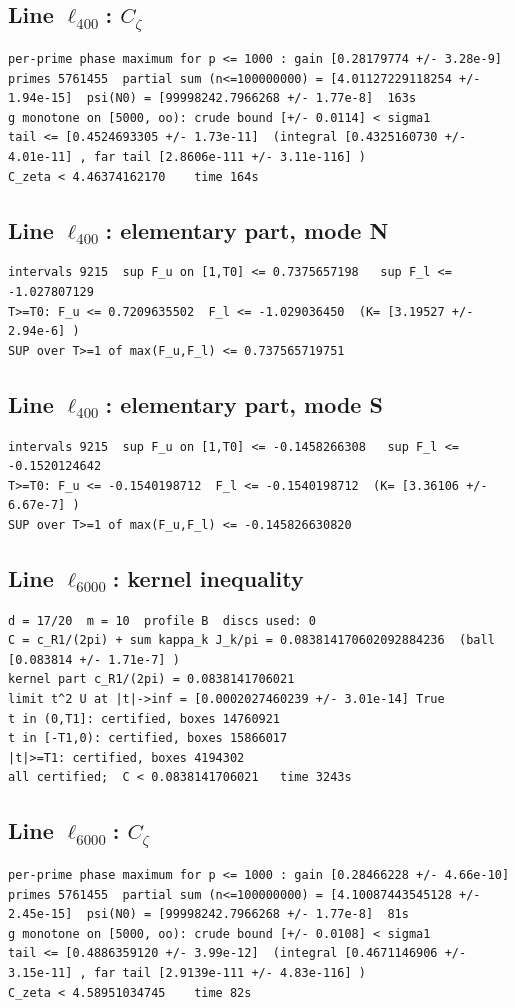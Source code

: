 \documentclass[11pt,reqno]{amsart}
\numberwithin{equation}{section}
\theoremstyle{definition}
\theoremstyle{remark}
\begin{document}
\subsection*{Line $\ell_{400}$: $C_\zeta$}
\begin{lstlisting}
per-prime phase maximum for p <= 1000 : gain [0.28179774 +/- 3.28e-9]
primes 5761455  partial sum (n<=100000000) = [4.01127229118254 +/- 1.94e-15]  psi(N0) = [99998242.7966268 +/- 1.77e-8]  163s
g monotone on [5000, oo): crude bound [+/- 0.0114] < sigma1
tail <= [0.4524693305 +/- 1.73e-11]  (integral [0.4325160730 +/- 4.01e-11] , far tail [2.8606e-111 +/- 3.11e-116] )
C_zeta < 4.46374162170    time 164s
\end{lstlisting}
\subsection*{Line $\ell_{400}$: elementary part, mode N}
\begin{lstlisting}
intervals 9215  sup F_u on [1,T0] <= 0.7375657198   sup F_l <= -1.027807129
T>=T0: F_u <= 0.7209635502  F_l <= -1.029036450  (K= [3.19527 +/- 2.94e-6] )
SUP over T>=1 of max(F_u,F_l) <= 0.737565719751
\end{lstlisting}
\subsection*{Line $\ell_{400}$: elementary part, mode S}
\begin{lstlisting}
intervals 9215  sup F_u on [1,T0] <= -0.1458266308   sup F_l <= -0.1520124642
T>=T0: F_u <= -0.1540198712  F_l <= -0.1540198712  (K= [3.36106 +/- 6.67e-7] )
SUP over T>=1 of max(F_u,F_l) <= -0.145826630820
\end{lstlisting}
\subsection*{Line $\ell_{6000}$: kernel inequality}
\begin{lstlisting}
d = 17/20  m = 10  profile B  discs used: 0
C = c_R1/(2pi) + sum kappa_k J_k/pi = 0.083814170602092884236  (ball [0.083814 +/- 1.71e-7] )
kernel part c_R1/(2pi) = 0.0838141706021
limit t^2 U at |t|->inf = [0.0002027460239 +/- 3.01e-14] True
t in (0,T1]: certified, boxes 14760921
t in [-T1,0): certified, boxes 15866017
|t|>=T1: certified, boxes 4194302
all certified;  C < 0.0838141706021   time 3243s
\end{lstlisting}
\subsection*{Line $\ell_{6000}$: $C_\zeta$}
\begin{lstlisting}
per-prime phase maximum for p <= 1000 : gain [0.28466228 +/- 4.66e-10]
primes 5761455  partial sum (n<=100000000) = [4.10087443545128 +/- 2.45e-15]  psi(N0) = [99998242.7966268 +/- 1.77e-8]  81s
g monotone on [5000, oo): crude bound [+/- 0.0108] < sigma1
tail <= [0.4886359120 +/- 3.99e-12]  (integral [0.4671146906 +/- 3.15e-11] , far tail [2.9139e-111 +/- 4.83e-116] )
C_zeta < 4.58951034745    time 82s
\end{lstlisting}
\end{document}
